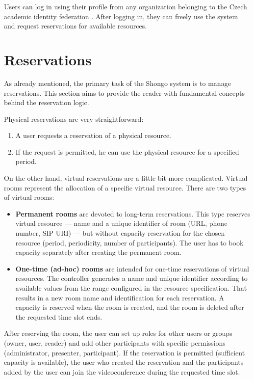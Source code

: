 Users can log in using their profile from any organization belonging to the Czech academic identity federation .
After logging in, they can freely use the system and request reservations for available resources.

\section{Reservations}
As already mentioned, the primary task of the Shongo system is to manage reservations. This section aims to provide the reader with fundamental concepts behind the reservation logic.

Physical reservations are very straightforward:
\begin{enumerate}
    \item A user requests a reservation of a physical resource.
    \item If the request is permitted, he can use the physical resource for a specified period.
\end{enumerate}

On the other hand, virtual reservations are a little bit more complicated. Virtual rooms represent the allocation of a specific virtual resource. There are two types of virtual rooms:
\begin{itemize}
    \item \textbf{Permanent rooms} are devoted to long-term reservations. This type reserves virtual resource --- name and a unique identifier of room (URL, phone number, SIP URI) --- but without capacity reservation for the chosen resource (period, periodicity, number of participants). The user has to book capacity separately after creating the permanent room.
    \item \textbf{One-time (ad-hoc) rooms} are intended for one-time reservations of virtual resources. The controller generates a name and unique identifier according to available values from the range configured in the resource specification. That results in a new room name and identification for each reservation. A capacity is reserved when the room is created, and the room is deleted after the requested time slot ends.
\end{itemize}
After reserving the room, the user can set up roles for other users or groups (owner, user, reader) and add other participants with specific permissions (administrator, presenter, participant).
If the reservation is permitted (sufficient capacity is available), the user who created the reservation and the participants added by the user can join the videoconference during the requested time slot.


